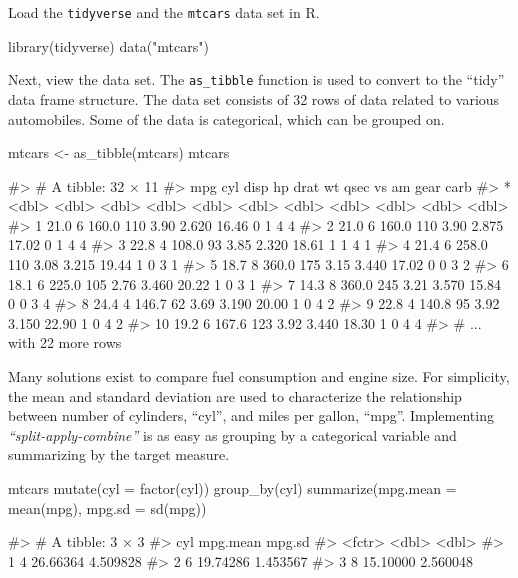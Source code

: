 Load the \texttt{tidyverse} and the \texttt{mtcars} data set in R.

\begin{Schunk}
\begin{Sinput}
library(tidyverse)
data("mtcars")
\end{Sinput}
\end{Schunk}

Next, view the data set. The \texttt{as\_tibble} function is used to
convert to the ``tidy'' data frame structure. The data set consists of
32 rows of data related to various automobiles. Some of the data is
categorical, which can be grouped on.

\begin{Schunk}
\begin{Sinput}
mtcars <- as_tibble(mtcars)
mtcars
\end{Sinput}
\begin{Soutput}
#> # A tibble: 32 × 11
#>      mpg   cyl  disp    hp  drat    wt  qsec    vs    am  gear  carb
#> *  <dbl> <dbl> <dbl> <dbl> <dbl> <dbl> <dbl> <dbl> <dbl> <dbl> <dbl>
#> 1   21.0     6 160.0   110  3.90 2.620 16.46     0     1     4     4
#> 2   21.0     6 160.0   110  3.90 2.875 17.02     0     1     4     4
#> 3   22.8     4 108.0    93  3.85 2.320 18.61     1     1     4     1
#> 4   21.4     6 258.0   110  3.08 3.215 19.44     1     0     3     1
#> 5   18.7     8 360.0   175  3.15 3.440 17.02     0     0     3     2
#> 6   18.1     6 225.0   105  2.76 3.460 20.22     1     0     3     1
#> 7   14.3     8 360.0   245  3.21 3.570 15.84     0     0     3     4
#> 8   24.4     4 146.7    62  3.69 3.190 20.00     1     0     4     2
#> 9   22.8     4 140.8    95  3.92 3.150 22.90     1     0     4     2
#> 10  19.2     6 167.6   123  3.92 3.440 18.30     1     0     4     4
#> # ... with 22 more rows
\end{Soutput}
\end{Schunk}

Many solutions exist to compare fuel consumption and engine size. For
simplicity, the mean and standard deviation are used to characterize the
relationship between number of cylinders, ``cyl'', and miles per gallon,
``mpg''. Implementing \emph{``split-apply-combine''} is as easy as
grouping by a categorical variable and summarizing by the target
measure.

\begin{Schunk}
\begin{Sinput}
mtcars %
    mutate(cyl = factor(cyl)) %
    group_by(cyl) %
    summarize(mpg.mean = mean(mpg),
              mpg.sd = sd(mpg))
\end{Sinput}
\begin{Soutput}
#> # A tibble: 3 × 3
#>      cyl mpg.mean   mpg.sd
#>   <fctr>    <dbl>    <dbl>
#> 1      4 26.66364 4.509828
#> 2      6 19.74286 1.453567
#> 3      8 15.10000 2.560048
\end{Soutput}
\end{Schunk}

